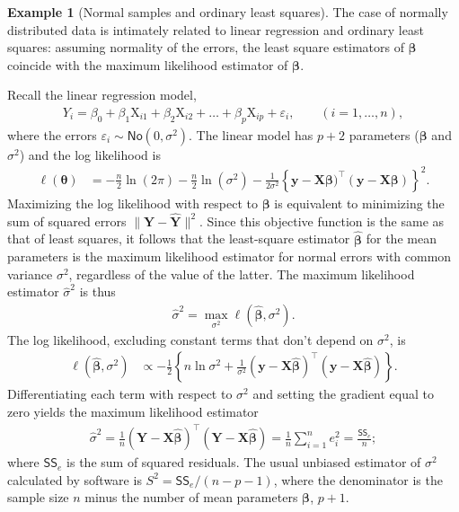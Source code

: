 \documentclass[
  11pt,
  letterpaper,
]{book}
\theoremstyle{definition}
\theoremstyle{definition}
\newtheorem{example}{Example}[chapter]
\theoremstyle{definition}
\theoremstyle{remark}
\begin{document}
\begin{example}[Normal samples and ordinary least squares]
The case of normally distributed data is intimately related to linear regression and ordinary least squares: assuming normality of the errors, the least square estimators of \(\boldsymbol{\beta}\) coincide with the maximum likelihood estimator of \(\boldsymbol{\beta}\).

Recall the linear regression model,
\begin{align*}
Y_i=\beta_0+\beta_1 \mathrm{X}_{i1}+\beta_2 \mathrm{X}_{i2}+\ldots +\beta_p \mathrm{X}_{ip} + \varepsilon_i, \qquad  (i=1, \ldots, n),
\end{align*}
where the errors \(\varepsilon_i \sim \mathsf{No}(0, \sigma^2)\).
The linear model has \(p+2\) parameters (\(\boldsymbol{\beta}\) and \(\sigma^2\)) and the log likelihood is
\begin{align*}
\ell(\boldsymbol{\theta})&=-\frac{n}{2} \ln(2\pi)-\frac{n}{2} \ln (\sigma^2) -\frac{1}{2\sigma^2}\left\{\boldsymbol{y}-\mathbf{X}\boldsymbol{\beta})^\top(\boldsymbol{y}-\mathbf{X}\boldsymbol{\beta})\right\}^2.
\end{align*}
Maximizing the log likelihood with respect to \(\boldsymbol{\beta}\) is equivalent to
minimizing the sum of squared errors \(\|\boldsymbol{Y} - \widehat{\boldsymbol{Y}}\|^2\). Since this objective function is the same as that of least squares, it follows that the least-square estimator \(\widehat{\boldsymbol{\beta}}\) for the mean parameters is the maximum likelihood estimator for normal errors with common variance \(\sigma^2\), regardless of the value of the latter. The maximum likelihood estimator \(\widehat{\sigma}^2\) is thus
\begin{align*}
\hat{\sigma}^2=\max_{\sigma^2} \ell(\widehat{\boldsymbol{\beta}}, \sigma^2).
\end{align*}
The log likelihood, excluding constant terms that don't depend on \(\sigma^2\), is
\begin{align*}
\ell(\widehat{\boldsymbol{\beta}}, \sigma^2)
&\propto-\frac{1}{2}\left\{n\ln\sigma^2+\frac{1}{\sigma^2}(\boldsymbol{y}-\mathbf{X}\hat{\boldsymbol{\beta}})^\top(\boldsymbol{y}-\mathbf{X}\hat{\boldsymbol{\beta}})\right\}.
\end{align*}
Differentiating each term with respect to \(\sigma^2\) and setting the gradient equal to zero yields the maximum likelihood estimator
\begin{align*}
\hat{\sigma}^2=\frac{1}{n}(\boldsymbol{Y}-\mathbf{X}\hat{\boldsymbol{\beta}})^\top(\boldsymbol{Y}-\mathbf{X}\hat{\boldsymbol{\beta}})= \frac{1}{n} \sum_{i=1}^n e_i^2= \frac{\mathsf{SS}_e}{n};
\end{align*}
where \(\mathsf{SS}_e\) is the sum of squared residuals. The usual unbiased estimator of \(\sigma^2\) calculated by software is \(S^2=\mathsf{SS}_e/(n-p-1)\), where the denominator is the sample size \(n\) minus the number of mean parameters \(\boldsymbol{\beta}\), \(p+1\).
\end{example}
\end{document}
